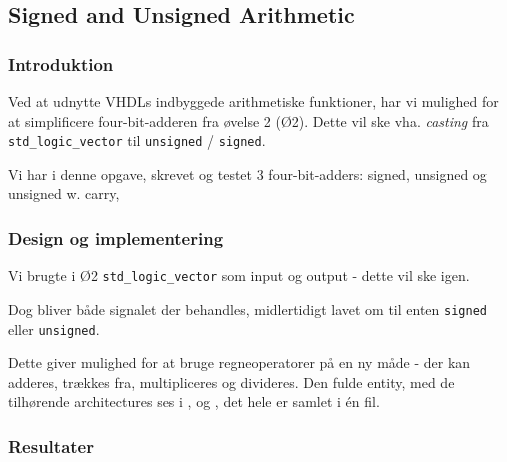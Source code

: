 \subsection{Signed and Unsigned Arithmetic}

\subsubsection{Introduktion}

Ved at udnytte VHDLs indbyggede arithmetiske funktioner, har vi mulighed for at simplificere four-bit-adderen fra øvelse 2 (Ø2).
Dette vil ske vha.  \textit{casting} fra \texttt{std\_logic\_vector} til \texttt{unsigned} / \texttt{signed}. 

Vi har i denne opgave, skrevet og testet 3 four-bit-adders: signed, unsigned og unsigned w. carry, 

\subsubsection{Design og implementering}

Vi brugte i Ø2 \texttt{std\_logic\_vector} som input og output - dette vil ske igen. 

Dog bliver både signalet der behandles, midlertidigt lavet om til enten \texttt{signed} eller \texttt{unsigned}.

Dette giver mulighed for at bruge regneoperatorer på en ny måde - der kan adderes, trækkes fra, multipliceres og divideres. Den fulde entity, med de tilhørende architectures ses i ,  og , det hele er samlet i én fil.




\subsubsection{Resultater}


